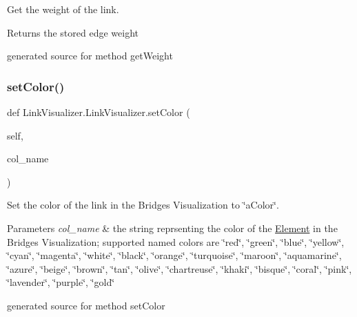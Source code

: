 Get the weight of the link. 

\begin{DoxyReturn}{Returns}
the stored edge weight\begin{DoxyVerb}generated source for method getWeight \end{DoxyVerb}
 
\end{DoxyReturn}
\hypertarget{class_link_visualizer_1_1_link_visualizer_a221d25adb57aa6a4b08a21b4187d6f5e}{}\label{class_link_visualizer_1_1_link_visualizer_a221d25adb57aa6a4b08a21b4187d6f5e} 
\subsubsection{\texorpdfstring{set\+Color()}{setColor()}}
{\footnotesize\ttfamily def Link\+Visualizer.\+Link\+Visualizer.\+set\+Color (\begin{DoxyParamCaption}\item[{}]{self,  }\item[{}]{col\+\_\+name }\end{DoxyParamCaption})}



Set the color of the link in the Bridges Visualization to \char`\"{}a\+Color\char`\"{}. 


\begin{DoxyParams}{Parameters}
{\em col\+\_\+name} & the string reprsenting the color of the \hyperlink{namespace_element}{Element} in the Bridges Visualization; supported named colors are \char`\"{}red\char`\"{}, \char`\"{}green\char`\"{}, \char`\"{}blue\char`\"{}, \char`\"{}yellow\char`\"{}, \char`\"{}cyan\char`\"{}, \char`\"{}magenta\char`\"{}, \char`\"{}white\char`\"{}, \char`\"{}black\char`\"{}, \char`\"{}orange\char`\"{}, \char`\"{}turquoise\char`\"{}, \char`\"{}maroon\char`\"{}, \char`\"{}aquamarine\char`\"{}, \char`\"{}azure\char`\"{}, \char`\"{}beige\char`\"{}, \char`\"{}brown\char`\"{}, \char`\"{}tan\char`\"{}, \char`\"{}olive\char`\"{}, \char`\"{}chartreuse\char`\"{}, \char`\"{}khaki\char`\"{}, \char`\"{}bisque\char`\"{}, \char`\"{}coral\char`\"{}, \char`\"{}pink\char`\"{}, \char`\"{}lavender\char`\"{}, \char`\"{}purple\char`\"{}, \char`\"{}gold\char`\"{}\begin{DoxyVerb}generated source for method setColor \end{DoxyVerb}
 \\
\hline
\end{DoxyParams}
\hypertarget{class_link_visualizer_1_1_link_visualizer_ac7e87dc16254a57290fd1738312193cc}{}\label{class_link_visualizer_1_1_link_visualizer_ac7e87dc16254a57290fd1738312193cc} 
